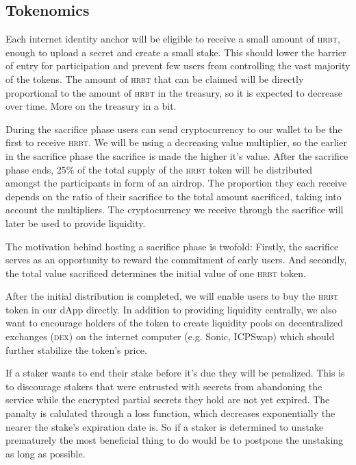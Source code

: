 \documentclass[
  11.5pt,
  a4paper,
  USenglish
]{article}
\begin{document}
\subsection*{Tokenomics}

Each internet identity anchor will be eligible to receive a small amount of \textsc{hrbt}, enough to upload a secret and create a small stake.
This should lower the barrier of entry for participation and prevent few users from controlling the vast majority of the tokens.
The amount of \textsc{hrbt} that can be claimed will be directly proportional to the amount of \textsc{hrbt} in the treasury, so it is expected to decrease over time.
More on the treasury in a bit.

During the sacrifice phase  users can send cryptocurrency to our wallet to be the first to receive \textsc{hrbt}.
We will be using a decreasing value multiplier, so the earlier in the sacrifice phase the sacrifice is made the higher it's value.
After the sacrifice phase ends, 25\% of the total supply of the \textsc{hrbt} token will be distributed amongst the participants in form of an airdrop.
The proportion they each receive depends on the ratio of their sacrifice to the total amount sacrificed, taking into account the multipliers.
The cryptocurrency we receive through the sacrifice will later be used to provide liquidity.

The motivation behind hosting a sacrifice phase is twofold:
Firstly, the sacrifice serves as an opportunity to reward the commitment of early users.
And secondly, the total value sacrificed determines the initial value of one \textsc{hrbt} token.

After  the initial distribution is completed, we will enable users to buy the \textsc{hrbt} token in our dApp directly.
In addition to providing liquidity centrally, we also want to encourage holders of the token to create liquidity pools on decentralized exchanges (\textsc{dex}) on the internet computer (e.g. Sonic, ICPSwap) which should further stabilize the token's price.

If  a staker wants to end their stake before it's due they will be penalized.
This is to discourage stakers that were entrusted with secrets from abandoning the service while the encrypted partial secrets they hold are not yet expired.
The panalty is calulated through a loss function, which decreases exponentially the nearer the stake's expiration date is.
So if a staker is determined to unstake prematurely the most beneficial thing to do would be to postpone the unstaking as long as possible.
\end{document}
